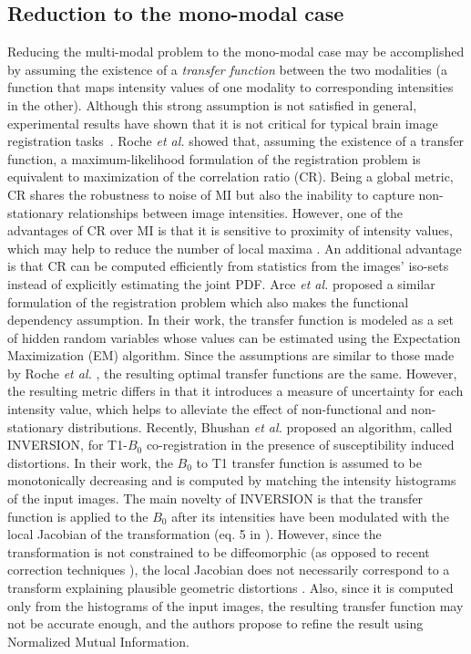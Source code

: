 \subsection{Reduction to the mono-modal case}
Reducing the multi-modal problem to the mono-modal case may be accomplished by assuming the existence of a {\it transfer function} between the two modalities (a function that maps intensity values of one modality to corresponding intensities in the other). Although this strong assumption is not satisfied in general, experimental results have shown that it is not critical for typical brain image registration tasks~\cite{Roche1998}. Roche {\it et al.} \cite{Roche2000} showed that, assuming the existence of a transfer function, a maximum-likelihood formulation of the registration problem is equivalent to maximization of the correlation ratio (CR). Being a global metric, CR shares the robustness to noise of MI but also the inability to capture non-stationary relationships between image intensities. However, one of the advantages of CR over MI is that it is sensitive to proximity of intensity values, which may help to reduce the number of local maxima \cite{Roche1998}. An additional advantage is that CR can be computed efficiently from statistics from the images' iso-sets instead of explicitly estimating the joint PDF. Arce {\it et al.} \cite{Arce-santana2014} proposed a similar formulation of the registration problem which also makes the functional dependency assumption. In their work, the transfer function is modeled as a set of hidden random variables whose values can be estimated using the Expectation Maximization (EM) algorithm. Since the assumptions are similar to those made by Roche {\it et al.} \cite{Roche1998, Roche2000}, the resulting optimal transfer functions are the same. However, the resulting metric differs in that it introduces a measure of uncertainty for each intensity value, which helps to alleviate the effect of non-functional and non-stationary distributions. Recently, Bhushan {\it et al.} \cite{Bhushan2015} proposed an algorithm, called INVERSION, for T1-$B_{0}$ co-registration in the presence of susceptibility induced distortions. In their work, the $B_0$ to T1 transfer function is assumed to be monotonically decreasing and is computed by matching the intensity histograms of the input images. The main novelty of INVERSION is that the transfer function is applied to the $B_0$ after its intensities have been modulated with the local Jacobian of the transformation (eq. 5 in \cite{Bhushan2015}). However, since the transformation is not constrained to be diffeomorphic (as opposed to recent correction techniques \cite{Ruthotto, Irfanoglu2015}), the local Jacobian does not necessarily correspond to a transform explaining plausible geometric distortions \cite{Chang1992}. Also, since it is computed only from the histograms of the input images, the resulting transfer function may not be accurate enough, and the authors propose to refine the result using Normalized Mutual Information.

